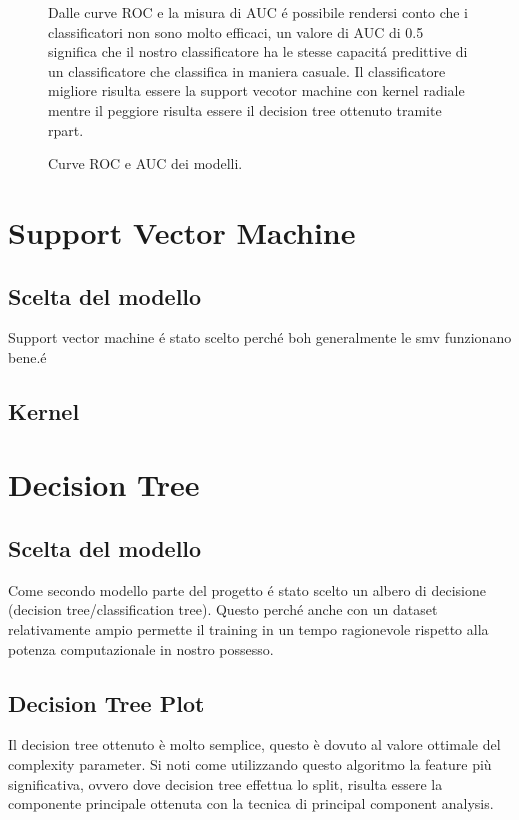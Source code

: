 \begin{figure}[H]
\caption{Curve ROC e AUC dei modelli.}

Dalle curve ROC e la misura di AUC é possibile rendersi conto che i
classificatori non sono molto efficaci, un valore di AUC di 0.5
significa che il nostro classificatore ha le stesse capacitá
predittive di un classificatore che classifica in maniera casuale. Il
classificatore migliore risulta essere la support vecotor machine con
kernel radiale mentre il peggiore risulta essere il decision tree
ottenuto tramite rpart.
\end{figure}

\section{Support Vector Machine}
\subsection{Scelta del modello}
Support vector machine é stato scelto perché boh generalmente le smv
funzionano bene.é

\subsection{Kernel}

\section{Decision Tree} \subsection{Scelta del modello} Come secondo
modello parte del progetto é stato scelto un albero di decisione
(decision tree/classification tree). Questo perché anche con un
dataset relativamente ampio permette il training in un tempo
ragionevole rispetto alla potenza computazionale in nostro possesso.

\subsection{Decision Tree Plot}
Il decision tree ottenuto è molto semplice, questo è dovuto al valore
ottimale del complexity parameter. Si noti come utilizzando questo algoritmo
la feature più significativa, ovvero dove decision tree effettua lo split, risulta
essere la componente principale ottenuta con la tecnica di principal
component analysis.



